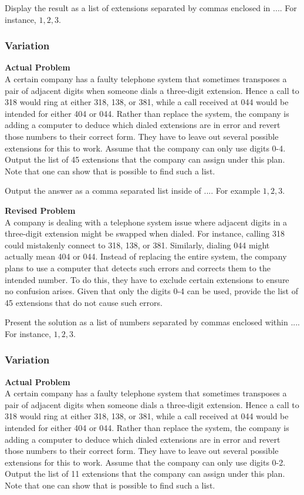 Display the result as a list of extensions separated by commas enclosed in $\boxed{...}$. For instance, $\boxed{1, 2, 3}$.

\subsubsection{Variation}
\textbf{Actual Problem}\\
A certain company has a faulty telephone system that sometimes transposes a pair of
adjacent digits when someone dials a three-digit extension. Hence a call to 318 would ring
at either 318, 138, or 381, while a call received at 044 would be intended for either
404 or 044. Rather than replace the system, the company is adding a computer to deduce
which dialed extensions are in error and revert those numbers to their correct form. They have
to leave out several possible extensions for this to work.
Assume that the company can only use digits 0-4. Output the list of 45 extensions that the company can assign under this plan.
Note that one can show that is possible to find such a list.


Output the answer as a comma separated list inside of $\boxed{...}$. For example $\boxed{1, 2, 3}$.

\textbf{Revised Problem}\\
A company is dealing with a telephone system issue where adjacent digits in a three-digit extension might be swapped when dialed. For instance, calling 318 could mistakenly connect to 318, 138, or 381. Similarly, dialing 044 might actually mean 404 or 044. Instead of replacing the entire system, the company plans to use a computer that detects such errors and corrects them to the intended number. To do this, they have to exclude certain extensions to ensure no confusion arises. Given that only the digits 0-4 can be used, provide the list of 45 extensions that do not cause such errors.

Present the solution as a list of numbers separated by commas enclosed within $\boxed{...}$. For instance, $\boxed{1, 2, 3}$.

\subsubsection{Variation}
\textbf{Actual Problem}\\
A certain company has a faulty telephone system that sometimes transposes a pair of
adjacent digits when someone dials a three-digit extension. Hence a call to 318 would ring
at either 318, 138, or 381, while a call received at 044 would be intended for either
404 or 044. Rather than replace the system, the company is adding a computer to deduce
which dialed extensions are in error and revert those numbers to their correct form. They have
to leave out several possible extensions for this to work.
Assume that the company can only use digits 0-2. Output the list of 11 extensions that the company can assign under this plan.
Note that one can show that is possible to find such a list.


